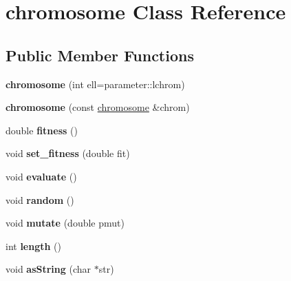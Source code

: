\hypertarget{classchromosome}{\section{chromosome \-Class \-Reference}
\label{classchromosome}
}
\subsection*{\-Public \-Member \-Functions}
\begin{DoxyCompactItemize}
\item 
\hypertarget{classchromosome_af74ec6514ce0f807b368151de2977fd5}{{\bfseries chromosome} (int ell=parameter\-::lchrom)}\label{classchromosome_af74ec6514ce0f807b368151de2977fd5}

\item 
\hypertarget{classchromosome_aeadeb0af96ac33a790c2b5637dd7ab7a}{{\bfseries chromosome} (const \hyperlink{classchromosome}{chromosome} \&chrom)}\label{classchromosome_aeadeb0af96ac33a790c2b5637dd7ab7a}

\item 
\hypertarget{classchromosome_a131d3e2ff2470fa8feece2277e0615d1}{double {\bfseries fitness} ()}\label{classchromosome_a131d3e2ff2470fa8feece2277e0615d1}

\item 
\hypertarget{classchromosome_a0c5035cf72ba164f3bb0c7e70df85d4e}{void {\bfseries set\-\_\-fitness} (double fit)}\label{classchromosome_a0c5035cf72ba164f3bb0c7e70df85d4e}

\item 
\hypertarget{classchromosome_af633b7ef2107c006120df73fa77153af}{void {\bfseries evaluate} ()}\label{classchromosome_af633b7ef2107c006120df73fa77153af}

\item 
\hypertarget{classchromosome_aeb9daa19cfb50bee93983b9b780f4d00}{void {\bfseries random} ()}\label{classchromosome_aeb9daa19cfb50bee93983b9b780f4d00}

\item 
\hypertarget{classchromosome_a7213fade7653f67226dbcbe24b372791}{void {\bfseries mutate} (double pmut)}\label{classchromosome_a7213fade7653f67226dbcbe24b372791}

\item 
\hypertarget{classchromosome_a727ab93293d5e28fe8998b90738cff7b}{int {\bfseries length} ()}\label{classchromosome_a727ab93293d5e28fe8998b90738cff7b}

\item 
\hypertarget{classchromosome_a5db5bdff45efedd1a1964970d9345bcb}{void {\bfseries as\-String} (char $\ast$str)}\label{classchromosome_a5db5bdff45efedd1a1964970d9345bcb}


\end{DoxyCompactItemize}
